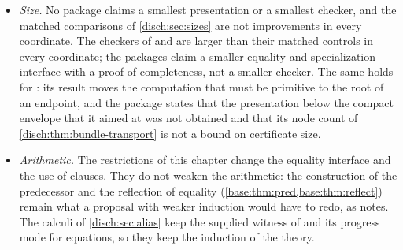 \begin{itemize}
 \cref{disch:thm:vsub-transport,disch:thm:name-transport} use the logical
 rules; no completeness statement is made for the equality rules alone.
 The fragment of ,  and  is
 the exception: it derives reflexivity, symmetry and transport by itself
 (\cref{disch:prop:alias-eq}).
\item \emph{Size.} No package claims a smallest presentation or a smallest
 checker, and the matched comparisons of \cref{disch:sec:sizes} are not
 improvements in every coordinate. The checkers of  and
  are larger than their matched controls in every
 coordinate; the packages claim a smaller equality and specialization
 interface with a proof of completeness, not a smaller checker. The same
 holds for : its result moves the
 computation that must be primitive to the root of an endpoint, and the
 package states that the presentation below the compact envelope that it
 aimed at was not obtained and that its node count of
 \cref{disch:thm:bundle-transport} is not a bound on certificate size.
\item \emph{Arithmetic.} The restrictions of this chapter change the
 equality interface and the use of clauses. They do not weaken the
 arithmetic: the construction of the predecessor and the reflection of
 equality (\cref{base:thm:pred,base:thm:reflect}) remain what a proposal
 with weaker induction would have to redo, as 
 notes. The calculi of \cref{disch:sec:alias} keep the supplied witness of
  and its progress mode for equations, so they keep the
 induction of the theory.
\end{itemize}
